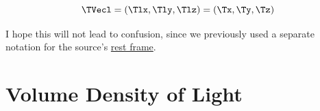 \begin{equation}
	\label{eq: position of light}
	\TVecl  = (\Tlx ,\Tly ,\Tlz ) = (\Tx ,\Ty ,\Tz )
\end{equation}

I hope this will not lead to confusion, since we previously used a separate notation for the source's \hyperlink{def-proper-frame}{rest frame}.



\section{Volume Density of Light}\label{sect: Field Scalar Density}





